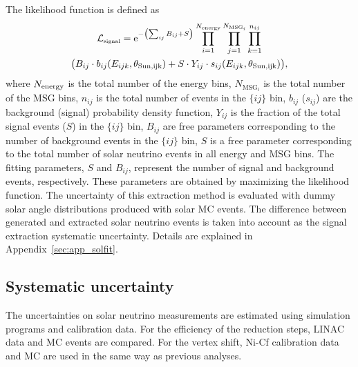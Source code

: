\documentclass[aps,prd,reprint,superscriptaddress,floatfix,altaffilletter,nofootinbib]{revtex4-2}
\begin{document}
The likelihood function is defined as
\begin{multline}
        \mathcal{L_{\mbox{\tiny signal}}}  =  \mathrm{e}^{- \left( \sum_{ij} B_{ij} + S\right) }
        \prod_{i=1}^{N_{\rm{energy}}}
        \prod_{j=1}^{N_{\rm{MSG}_{\it{i}}}} \prod_{k=1}^{n_{ij}}
        \\
        \big( B_{ij} \cdot b_{ij}(E_{ijk},\theta_{\rm{Sun, ijk}}) 
         + S \cdot Y_{ij} \cdot s_{ij}(E_{ijk},\theta_{\rm{Sun, ijk}}) \big),
    \label{eq:solfit}
    \end{multline}
where
$N_{\rm{energy}}$ is the total number of the energy bins,
$N_{\mathrm{MSG}_i}$ is the total number of the MSG bins,
$n_{ij}$ is the total number of events in the  $\{ij\}$ bin,
$b_{ij}$ ($s_{ij}$) are the background (signal) probability density function,
$Y_{ij}$ is the fraction of the total signal events ($S$) in the $\{ij\}$ bin,
$B_{ij}$ are free parameters corresponding to the number of background events in the  $\{ij\}$ bin,
$S$ is a free parameter corresponding to the total number of solar neutrino events in all energy and MSG bins.
The fitting parameters, $S$ and $B_{ij}$, represent the number of signal and background events, respectively. 
These parameters are obtained by maximizing the likelihood function.
The uncertainty of this extraction method is evaluated with dummy solar angle distributions produced with solar MC events. The difference between generated and extracted solar neutrino events is taken into account as the signal extraction systematic uncertainty.
Details are explained in Appendix~\ref{sec:app_solfit}.


\subsection{Systematic uncertainty}

The uncertainties on solar neutrino measurements are estimated using simulation programs and calibration data.
For the efficiency of the reduction steps, LINAC data and MC events are compared.
For the vertex shift, Ni-Cf calibration data and MC are used in the same way as previous analyses.
\end{document}
